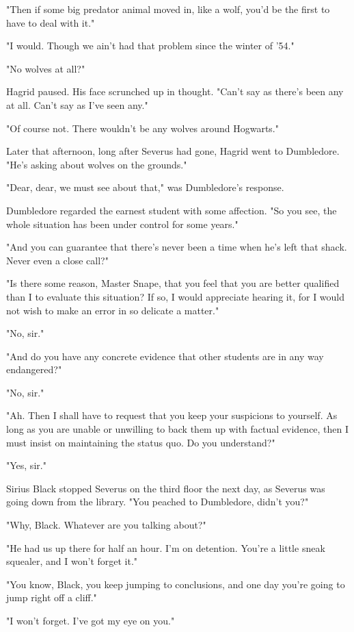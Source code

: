 \documentclass[a4paper,11pt]{article}
\begin{document}
"Then if some big predator animal moved in, like a wolf, you'd be the first to have to deal with it."

"I would. Though we ain't had that problem since the winter of '54."

"No wolves at all?"

Hagrid paused. His face scrunched up in thought. "Can't say as there's been any at all. Can't say as I've seen any."

"Of course not. There wouldn't be any wolves around Hogwarts."

Later that afternoon, long after Severus had gone, Hagrid went to Dumbledore. "He's asking about wolves on the grounds."

"Dear, dear, we must see about that," was Dumbledore's response.

Dumbledore regarded the earnest student with some affection. "So you see, the whole situation has been under control for some years."

"And you can guarantee that there's never been a time when he's left that shack. Never even a close call?"

"Is there some reason, Master Snape, that you feel that you are better qualified than I to evaluate this situation? If so, I would appreciate hearing it, for I would not wish to make an error in so delicate a matter."

"No, sir."

"And do you have any concrete evidence that other students are in any way endangered?"

"No, sir."

"Ah. Then I shall have to request that you keep your suspicions to yourself. As long as you are unable or unwilling to back them up with factual evidence, then I must insist on maintaining the status quo. Do you understand?"

"Yes, sir."

Sirius Black stopped Severus on the third floor the next day, as Severus was going down from the library. "You peached to Dumbledore, didn't you?"

"Why, Black. Whatever are you talking about?"

"He had us up there for half an hour. I'm on detention. You're a little sneak squealer, and I won't forget it."

"You know, Black, you keep jumping to conclusions, and one day you're going to jump right off a cliff."

"I won't forget. I've got my eye on you."
\end{document}
